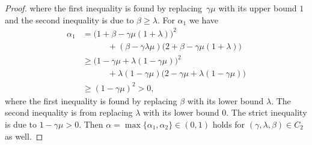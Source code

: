\documentclass[10pt,a4paper]{amsart}
\begin{document}
\begin{proof}
    where the first inequality is found by replacing~$\gamma\mu$ with its upper bound $1$ and 
    the second inequality is due to $\beta\geq\lambda$.
    For $\alpha_1$ we have
    \begin{align}
        \alpha_1 &=\big(1+\beta-\gamma\mu(1+\lambda)\big)^2
        \\ &\quad\quad\quad + (\beta-\gamma\lambda\mu)\big(2+\beta-\gamma\mu(1+\lambda)\big)
        \\ &\geq \big(1 -\gamma\mu + \lambda(1-\gamma\mu)\big)^2
        \\ &\quad\quad\quad + \lambda(1-\gamma\mu)\big(2-\gamma\mu+\lambda(1-\gamma\mu)\big)
        \\ &\geq (1-\gamma\mu)^2 >0,
    \end{align}
    where the first inequality is found by replacing $\beta$ with its lower bound $\lambda$. 
    The second inequality is from replacing $\lambda$ with its lower bound $0$.
    The strict inequality is due to $1-\gamma\mu>0$.
    Then $\alpha=\max\{\alpha_1,\alpha_2\}\in(0,1)$ holds for $(\gamma,\lambda,\beta)\in C_2$
    as well. 
    \end{proof}
\end{document}

